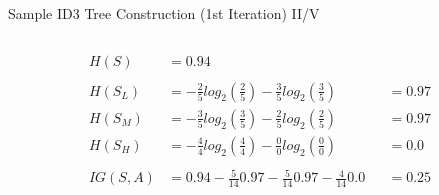 \documentclass[document.tex]{subfiles}
\begin{document}
\begin{frame}{Sample ID3 Tree Construction (1st Iteration) II/V}
\begin{columns}
\begin{column}{0.6\textwidth}
\begin{alignat*}{3}
                    H(S) &= 0.94 \\\\
                    H(S_L) &= -\frac{2}{5}log_2(\frac{2}{5}) - \frac{3}{5}log_2(\frac{3}{5}) &&= 0.97 \\
                    H(S_M) &= -\frac{3}{5}log_2(\frac{3}{5}) - \frac{2}{5}log_2(\frac{2}{5}) &&= 0.97 \\
                    H(S_H) &= -\frac{4}{4}log_2(\frac{4}{4}) - \frac{0}{0}log_2(\frac{0}{0}) &&= 0.0 \\\\
                    IG(S, A) &= 0.94 - \frac{5}{14} 0.97 - \frac{5}{14} 0.97 - \frac{4}{14} 0.0 &&= 0.25
                \end{alignat*}
            \end{column}
        \end{columns}
    \end{frame}
\end{document}

